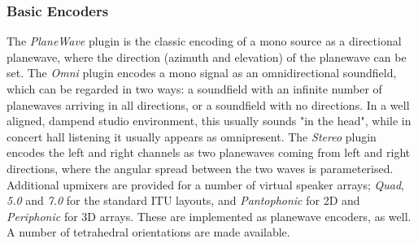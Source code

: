 \documentclass{article}
\begin{document}
%

\subsubsection{Basic Encoders}\label{sec:bas-encoders}
The \emph{PlaneWave} plugin is the classic encoding of a mono source as a directional plane\-wave, where the direction (azimuth and elevation) of the planewave can be set.
The \emph{Omni} plugin encodes a mono signal as an omnidirectional soundfield, which can be regarded in two ways:
a soundfield with an infinite number of plane\-waves arriving in all directions, or a soundfield with no directions.
In a well aligned, dampend studio environment, this usually sounds "in the head", while in concert hall listening it usually appears as omnipresent.
The \emph{Stereo} plugin encodes the left and right channels as two planewaves coming from left and right directions, where the angular spread between the two waves is parameterised.
Additional upmixers are provided for a number of virtual spea\-ker arrays; \emph{Quad}, \emph{5.0} and \emph{7.0} for the standard ITU layouts, and \emph{Pantophonic} for 2D and \emph{Periphonic} for 3D arrays.
These are implemented as planewave encoders, as well. A number of tetrahedral orientations are made available.
\end{document}
